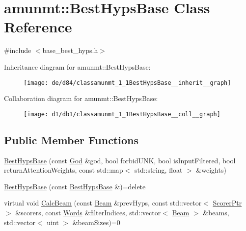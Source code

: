 \hypertarget{classamunmt_1_1BestHypsBase}{}\section{amunmt\+:\+:Best\+Hyps\+Base Class Reference}
\label{classamunmt_1_1BestHypsBase}


{\ttfamily \#include $<$base\+\_\+best\+\_\+hyps.\+h$>$}



Inheritance diagram for amunmt\+:\+:Best\+Hyps\+Base\+:
\nopagebreak
\begin{figure}[H]
\begin{center}
\leavevmode
\texttt{[image: de/d84/classamunmt\_1\_1BestHypsBase\_\_inherit\_\_graph]}
\end{center}
\end{figure}


Collaboration diagram for amunmt\+:\+:Best\+Hyps\+Base\+:
\nopagebreak
\begin{figure}[H]
\begin{center}
\leavevmode
\texttt{[image: d1/db1/classamunmt\_1\_1BestHypsBase\_\_coll\_\_graph]}
\end{center}
\end{figure}
\subsection*{Public Member Functions}
\begin{DoxyCompactItemize}
\item 
\hyperlink{classamunmt_1_1BestHypsBase_a3e4050cb487c3632a94e30548aabb21b}{Best\+Hyps\+Base} (const \hyperlink{classamunmt_1_1God}{God} \&god, bool forbid\+U\+NK, bool is\+Input\+Filtered, bool return\+Attention\+Weights, const std\+::map$<$ std\+::string, float $>$ \&weights)
\item 
\hyperlink{classamunmt_1_1BestHypsBase_af1d0f69c5403b2d2c4107fd8ea7e8f93}{Best\+Hyps\+Base} (const \hyperlink{classamunmt_1_1BestHypsBase}{Best\+Hyps\+Base} \&)=delete
\item 
virtual void \hyperlink{classamunmt_1_1BestHypsBase_aa96754b7043e0214480b5010f11676eb}{Calc\+Beam} (const \hyperlink{namespaceamunmt_a534a3a9a1d99c01a5adf05e700a26012}{Beam} \&prev\+Hyps, const std\+::vector$<$ \hyperlink{namespaceamunmt_a703e88438d533fef1db5cc95060b36f0}{Scorer\+Ptr} $>$ \&scorers, const \hyperlink{namespaceamunmt_aa50d0b3a5ba58ba5da8a4d88ddab1b18}{Words} \&filter\+Indices, std\+::vector$<$ \hyperlink{namespaceamunmt_a534a3a9a1d99c01a5adf05e700a26012}{Beam} $>$ \&beams, std\+::vector$<$ uint $>$ \&beam\+Sizes)=0
\end{DoxyCompactItemize}
